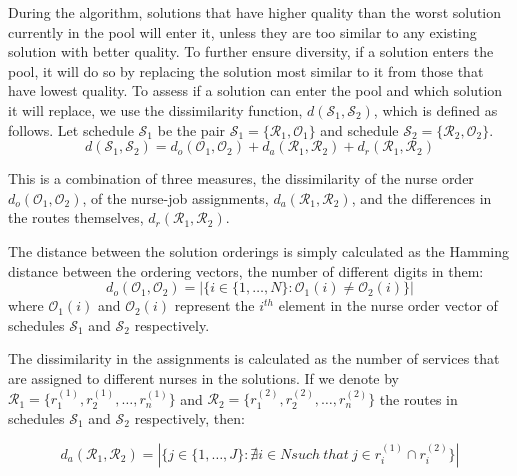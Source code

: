 \documentclass[a4paper,11pt]{elsarticle}
\begin{document}
During the algorithm, solutions that have higher quality than the worst solution currently in the pool will enter it, unless they are too similar to any existing solution with better quality. To further ensure diversity, if a solution enters the pool, it will do so by replacing the solution most similar to it from those that have lowest quality. To assess if a solution can enter the pool and which solution it will replace, we use the dissimilarity function, $d(\mathcal{S}_1, \mathcal{S}_2)$, which is defined as follows. Let schedule $\mathcal{S}_1$ be the pair $\mathcal{S}_1 = \{\mathcal{R}_1, \mathcal{O}_1\}$ and schedule $\mathcal{S}_2 = \{\mathcal{R}_2, \mathcal{O}_2\}$.
\begin{equation}
    d(\mathcal{S}_1, \mathcal{S}_2) = d_o(\mathcal{O}_1, \mathcal{O}_2) + d_a(\mathcal{R}_1, \mathcal{R}_2) + d_r(\mathcal{R}_1, \mathcal{R}_2)
\end{equation}

This is a combination of three measures, the dissimilarity of the nurse order $d_o(\mathcal{O}_1, \mathcal{O}_2)$, of the nurse-job assignments, $d_a(\mathcal{R}_1, \mathcal{R}_2)$, and the differences in the routes themselves, $d_r(\mathcal{R}_1, \mathcal{R}_2)$.

The distance between the solution orderings is simply calculated as the Hamming distance between the ordering vectors, \ie the number of different digits in them:
\begin{equation}
    d_o(\mathcal{O}_1, \mathcal{O}_2) = |\{i\in\{1,\dots,N\} : \mathcal{O}_1(i) \neq  \mathcal{O}_2(i)\}|
\end{equation}
where $\mathcal{O}_1(i)$ and $\mathcal{O}_2(i)$ represent the $i^{th}$ element in the nurse order vector of schedules $\mathcal{S}_1$ and $\mathcal{S}_2$ respectively.

The dissimilarity in the assignments is calculated as the number of services that are assigned to different nurses in the solutions. If we denote by $\mathcal{R}_1 = \{
r^{(1)}_1, r^{(1)}_2, \dots, r^{(1)}_n\}$ and $\mathcal{R}_2 = \{r^{(2)}_1, r^{(2)}_2, \dots, r^{(2)}_n\}$ the routes in schedules $\mathcal{S}_1$ and $\mathcal{S}_2$ respectively, then:

\begin{equation}
    d_a(\mathcal{R}_1, \mathcal{R}_2) = |\{j\in\{1,\dots,J\} : \nexists i \in N such\ that\ j \in r^{(1)}_i \cap r^{(2)}_i\}|
\end{equation}
\end{document}
